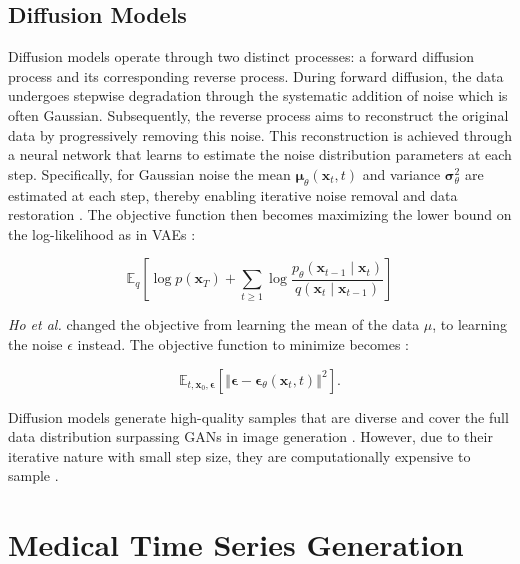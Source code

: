 \subsection{Diffusion Models}

Diffusion models operate through two distinct processes: a forward diffusion process and its corresponding reverse process. During forward diffusion, the data undergoes stepwise degradation through the systematic addition of noise which is often Gaussian. Subsequently, the reverse process aims to reconstruct the original data by progressively removing this noise. This reconstruction is achieved through a neural network that learns to estimate the noise distribution parameters at each step. Specifically, for Gaussian noise the mean \( \mathbf{\mu}_\theta(\mathbf{x}_t, t) \) and variance \( \mathbf{\sigma}^2_\theta \) are estimated at each step, thereby enabling iterative noise removal and data restoration \cite{sohl-dicksteinDeepUnsupervisedLearning2015}. The objective function then becomes maximizing the lower bound on the log-likelihood as in VAEs \cite{hoDenoisingDiffusionProbabilistic2020}:

\begin{equation}
\mathbb{E}_q \left[
    \log p(\mathbf{x}_T) 
    + \sum_{t \geq 1} \log 
    \frac{p_\theta(\mathbf{x}_{t-1} \mid \mathbf{x}_t)}{q(\mathbf{x}_t \mid \mathbf{x}_{t-1})}
\right]
\end{equation}

\noindent \textit{Ho et al.} \cite{hoDenoisingDiffusionProbabilistic2020} changed the objective from learning the mean of the data \( \mu \), to learning the noise \( \epsilon \) instead. The objective function to minimize becomes \cite{hoDenoisingDiffusionProbabilistic2020, kazerouniDiffusionModelsMedical2023}:

\begin{equation}
    \mathbb{E}_{t, \mathbf{x}_0, \mathbf{\epsilon}} \left[
    \left\Vert
    \mathbf{\epsilon} - 
    \mathbf{\epsilon}_\theta \left( \mathbf{x}_t, t \right)
    \right\Vert^2
    \right].
\end{equation}

\noindent Diffusion models generate high-quality samples that are diverse and cover the full data distribution surpassing GANs in image generation \cite{nicholImprovedDenoisingDiffusion2021}. However, due to their iterative nature with small step size, they are computationally expensive to sample \cite{xiaoTacklingGenerativeLearning2022}.
 
\section{Medical Time Series Generation}

